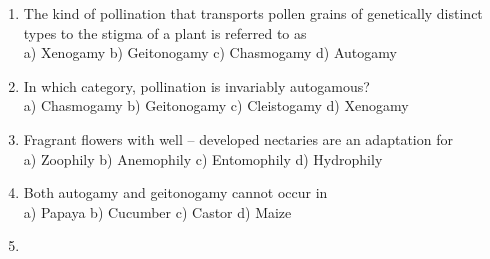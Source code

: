 \begin{enumerate}
\item
  The kind of pollination that transports pollen grains of genetically
  distinct types to the stigma of a plant is referred to as\\
  a) Xenogamy b) Geitonogamy c) Chasmogamy d) Autogamy
\item
  In which category, pollination is invariably autogamous?\\
  a) Chasmogamy b) Geitonogamy c) Cleistogamy d) Xenogamy
\item
  Fragrant flowers with well -- developed nectaries are an adaptation
  for\\
  a) Zoophily b) Anemophily c) Entomophily d) Hydrophily
\item
  Both autogamy and geitonogamy cannot occur in\\
  a) Papaya b) Cucumber c) Castor d) Maize
 \item
\end{enumerate}
